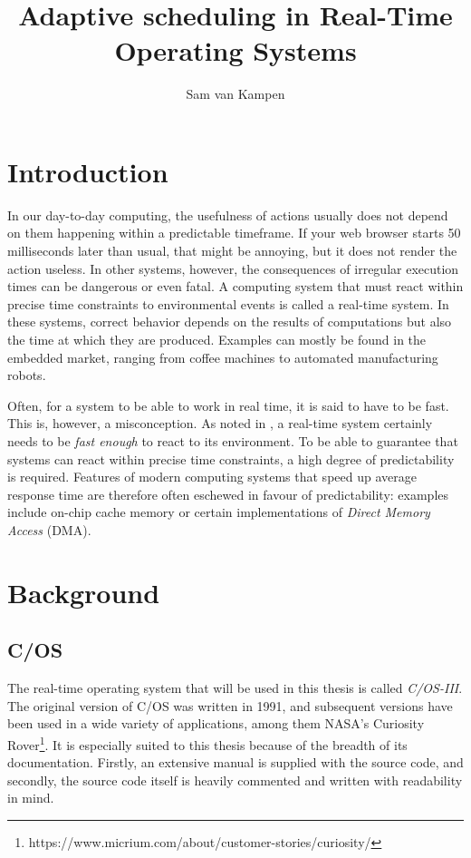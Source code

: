 \documentclass[twoside]{uva-inf-bachelor-thesis}
\title{Adaptive scheduling in Real-Time Operating Systems}
\author{Sam van Kampen}
\newcommand{\ucosiii}{\textmu C/OS-III\xspace}
\newcommand{\ucos}{\textmu C/OS\xspace}
\begin{document}
\maketitle

\begin{abstract}
\end{abstract}

\tableofcontents

\chapter{Introduction}
In our day-to-day computing, the usefulness of actions usually does not depend on them happening within a predictable timeframe. If your web browser starts 50 milliseconds later than usual, that might be annoying, but it does not render the action useless. In other systems, however, the consequences of irregular execution times can be dangerous or even fatal. A computing system that must react within precise time constraints to environmental events is called a real-time system\cite{buttazzo2011hard}. In these systems, correct behavior depends on the results of computations but also the time at which they are produced. Examples can mostly be found in the embedded market, ranging from coffee machines to automated manufacturing robots.

Often, for a system to be able to work in real time, it is said to have to be fast. This is, however, a misconception. As noted in \textcite{buttazzo2011hard}, a real-time system certainly needs to be \textit{fast enough} to react to its environment. 
To be able to guarantee that systems can react within precise time constraints, a high degree of predictability is required. Features of modern computing systems that speed up average response time are therefore often eschewed in favour of predictability: examples include on-chip cache memory or certain implementations of \textit{Direct Memory Access} (DMA).


\chapter{Background}
\section{\ucos} \label{sec:ucos}
The real-time operating system that will be used in this thesis is called \textit{\ucosiii}. The original version of \ucos was written in 1991, and subsequent versions have been used in a wide variety of applications, among them NASA's Curiosity Rover\footnote{https://www.micrium.com/about/customer-stories/curiosity/}. It is especially suited to this thesis because of the breadth of its documentation. Firstly, an extensive manual \cite{micrium:ucosmanual} is supplied with the source code, and secondly, the source code itself is heavily commented and written with readability in mind.
\end{document}
